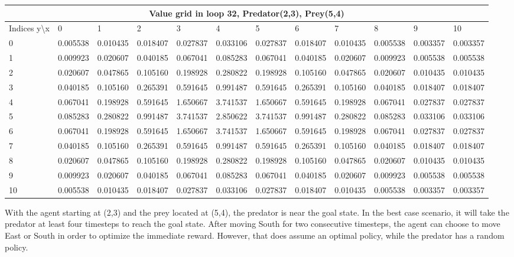 \documentclass{article}
\begin{document}
\begin{center}
\scalebox{0.7}
	{
	\begin{tabular}{ |l | l | l | l | l | l | l | l | l | l | l | l|}
	\hline
	\multicolumn{12}{|c|}{Value grid in loop 32, Predator(2,3), Prey(5,4)}\\
	\hline
	Indices y\textbackslash x &0 & 1 & 2 & 3 & 4 & 5 & 6 & 7 & 8 & 9 & 10 \\ 

\hline
0 & 0.005538 & 0.010435 & 0.018407 & 0.027837 & 0.033106 & 0.027837 & 0.018407 & 0.010435 & 0.005538 & 0.003357 & 0.003357 \\
1 & 0.009923 & 0.020607 & 0.040185 & 0.067041 & 0.085283 & 0.067041 & 0.040185 & 0.020607 & 0.009923 & 0.005538 & 0.005538 \\
2 & 0.020607 & 0.047865 & 0.105160 & \cellcolor{green!40}0.198928 & 0.280822 & 0.198928 & 0.105160 & 0.047865 & 0.020607 & 0.010435 & 0.010435 \\
3 & 0.040185 & 0.105160 & 0.265391 & 0.591645 & 0.991487 & 0.591645 & 0.265391 & 0.105160 & 0.040185 & 0.018407 & 0.018407 \\
4 & 0.067041 & 0.198928 & 0.591645 & 1.650667 & 3.741537 & 1.650667 & 0.591645 & 0.198928 & 0.067041 & 0.027837 & 0.027837 \\
5 & 0.085283 & 0.280822 & 0.991487 & 3.741537 & \cellcolor{red!40}2.850622 & 3.741537 & 0.991487 & 0.280822 & 0.085283 & 0.033106 & 0.033106 \\
6 & 0.067041 & 0.198928 & 0.591645 & 1.650667 & 3.741537 & 1.650667 & 0.591645 & 0.198928 & 0.067041 & 0.027837 & 0.027837 \\
7 & 0.040185 & 0.105160 & 0.265391 & 0.591645 & 0.991487 & 0.591645 & 0.265391 & 0.105160 & 0.040185 & 0.018407 & 0.018407 \\
8 & 0.020607 & 0.047865 & 0.105160 & 0.198928 & 0.280822 & 0.198928 & 0.105160 & 0.047865 & 0.020607 & 0.010435 & 0.010435 \\
9 & 0.009923 & 0.020607 & 0.040185 & 0.067041 & 0.085283 & 0.067041 & 0.040185 & 0.020607 & 0.009923 & 0.005538 & 0.005538 \\
10 & 0.005538 & 0.010435 & 0.018407 & 0.027837 & 0.033106 & 0.027837 & 0.018407 & 0.010435 & 0.005538 & 0.003357 & 0.003357 \\
\hline
	\end{tabular}
	}
\end{center}

With the agent starting at (2,3) and the prey located at (5,4), the predator is near the goal state. In the best case scenario, it will take the predator at least four timesteps to reach the goal state. After moving South for two consecutive timesteps, the agent can choose to move East or South in order to optimize the immediate reward. However, that does assume an optimal policy, while the predator has a random policy. %
\end{document}
